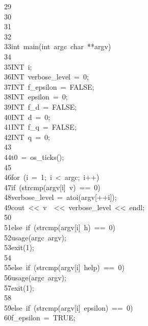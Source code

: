 \begin{tabbing}
29\>\\[0pt]
30\>\\[0pt]
31\>\\[0pt]
32\>\\[0pt]
33\>int\ main(int\ argc\ char\ **argv)\\[0pt]
34\>\\[0pt]
35\>\>INT\ i;\\[0pt]
36\>\>INT\ verbose\_level\ =\ 0;\\[0pt]
37\>\>INT\ f\_epsilon\ =\ FALSE;\\[0pt]
38\>\>INT\ epsilon\ =\ 0;\\[0pt]
39\>\>INT\ f\_d\ =\ FALSE;\\[0pt]
40\>\>INT\ d\ =\ 0;\\[0pt]
41\>\>INT\ f\_q\ =\ FALSE;\\[0pt]
42\>\>INT\ q\ =\ 0;\\[0pt]
43\>\\[0pt]
44\>\>t0\ =\ os\_ticks();\\[0pt]
45\>\>\\[0pt]
46\>\>for\ (i\ =\ 1;\ i\ <\ argc;\ i++)\ \\[0pt]
47\>\>\>if\ (strcmp(argv[i]\ v)\ ==\ 0)\ \\[0pt]
48\>\>\>\>verbose\_level\ =\ atoi(argv[++i]);\\[0pt]
49\>\>\>\>cout\ <<\ v\ \ <<\ verbose\_level\ <<\ endl;\\[0pt]
50\>\>\>\>\\[0pt]
51\>\>\>else\ if\ (strcmp(argv[i]\ h)\ ==\ 0)\ \\[0pt]
52\>\>\>\>usage(argc\ argv);\\[0pt]
53\>\>\>\>exit(1);\\[0pt]
54\>\>\>\>\\[0pt]
55\>\>\>else\ if\ (strcmp(argv[i]\ help)\ ==\ 0)\ \\[0pt]
56\>\>\>\>usage(argc\ argv);\\[0pt]
57\>\>\>\>exit(1);\\[0pt]
58\>\>\>\>\\[0pt]
59\>\>\>else\ if\ (strcmp(argv[i]\ epsilon)\ ==\ 0)\ \\[0pt]
60\>\>\>\>f\_epsilon\ =\ TRUE;\\[0pt]

\end{tabbing}
